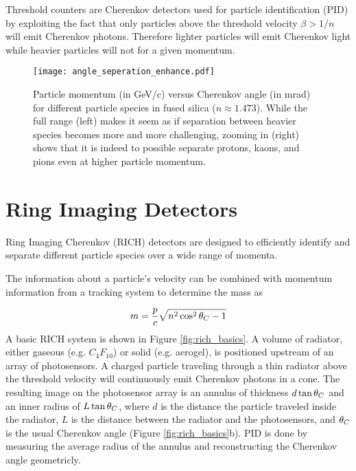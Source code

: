 Threshold counters are Cherenkov detectors used for particle identification (PID) by exploiting the fact that only particles above the threshold velocity $\beta > 1/n$ will emit Cherenkov photons. Therefore lighter particles will emit Cherenkov light while heavier particles will not for a given momentum.

\begin{figure}[!htb]
	\centering
	\texttt{[image: angle\_seperation\_enhance.pdf]}
	\caption[Particle momentum (in GeV/c) versus Cherenkov angle (in mrad) for different particle species in fused silica ($n \approx 1.473$).]{Particle momentum (in GeV/c) versus Cherenkov angle (in mrad) for different particle species in fused silica ($n \approx 1.473$). While the full range (left) makes it seem as if separation between heavier species becomes more and more challenging, zooming in (right) shows that it is indeed to possible separate protons, kaons, and pions even at higher particle momentum.}
	\label{fig:angleseperation}
\end{figure}

\section{Ring Imaging Detectors}
Ring Imaging Cherenkov (RICH) detectors are designed to efficiently identify and separate different particle species over a wide range of momenta.

The information about a particle's velocity can be combined with momentum information from a tracking system to determine the mass as \cite{ParticleDetectionHandbook}

\begin{equation}
	m = \frac{p}{c} \sqrt{n^2 \cos^2\theta_{C} - 1}
	\label{eq:mass}
\end{equation}
%
A basic RICH system is shown in Figure \ref{fig:rich_basics}. A volume of radiator, either gaseous (e.g. $C_{4}F_{10}$) or solid (e.g. aerogel), is positioned upstream of an array of photosensors. A charged particle traveling through a thin radiator above the threshold velocity will continuously emit Cherenkov photons in a cone. The resulting image on the photosensor array is an annulus of thickness $d\tan\theta_{C}$ and an inner radius of $L\tan\theta_{C}$, where $d$ is the distance the particle traveled inside the radiator, $L$ is the distance between the radiator and the photosensors, and  $\theta_{C}$ is the usual Cherenkov angle (Figure \ref{fig:rich_basics}b). PID is done by measuring the average radius of the annulus and reconstructing the Cherenkov angle geometricly.

